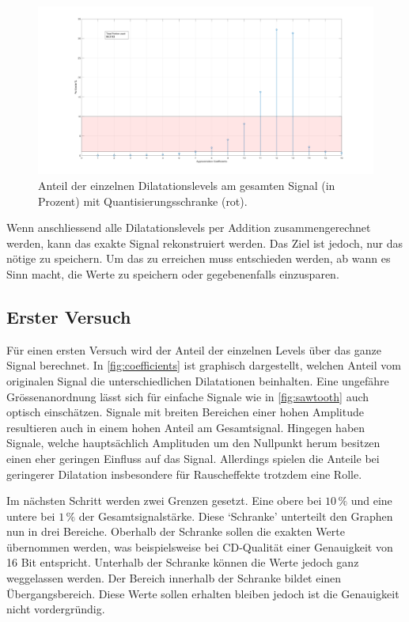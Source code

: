\begin{refsection}
\begin{figure}
	\centering
	\includegraphics[width=\linewidth]{papers/compress/Bilder/recCoefs}
	\caption{Anteil der einzelnen Dilatationslevels am gesamten Signal (in Prozent) mit Quantisierungsschranke (rot).}
	\label{fig:coefficients}
\end{figure} 

Wenn anschliessend alle Dilatationslevels per Addition zusammengerechnet werden, kann das exakte Signal rekonstruiert werden.
Das Ziel ist jedoch, nur das nötige zu speichern.
Um das zu erreichen muss entschieden werden, ab wann es Sinn macht, die Werte zu speichern oder gegebenenfalls einzusparen.

\subsection{Erster Versuch}
Für einen ersten Versuch wird der Anteil der einzelnen Levels über das ganze Signal berechnet.
In \autoref{fig:coefficients} ist graphisch dargestellt, welchen Anteil vom originalen Signal die unterschiedlichen Dilatationen beinhalten.
Eine ungefähre Grössenanordnung lässt sich für einfache Signale wie in \autoref{fig:sawtooth} auch optisch einschätzen.
Signale mit breiten Bereichen einer hohen Amplitude resultieren auch in einem hohen Anteil am Gesamtsignal. 
Hingegen haben Signale, welche hauptsächlich Amplituden um den Nullpunkt herum besitzen einen eher geringen Einfluss auf das Signal.
Allerdings spielen die Anteile bei geringerer Dilatation insbesondere für Rauscheffekte trotzdem eine Rolle.

Im nächsten Schritt werden zwei Grenzen gesetzt.
Eine obere bei  $10\,\text{\%}$ und eine untere bei $1\,\text{\%}$ der Gesamtsignalstärke.
Diese `Schranke' unterteilt den Graphen nun in drei Bereiche. 
Oberhalb der Schranke sollen die exakten Werte übernommen werden, was beispielsweise bei CD-Qualität einer Genauigkeit von 16 Bit entspricht.
Unterhalb der Schranke können die Werte jedoch ganz weggelassen werden.
Der Bereich innerhalb der Schranke bildet einen Übergangsbereich.
Diese Werte sollen erhalten bleiben jedoch ist die Genauigkeit nicht vordergründig.


\end{refsection}
